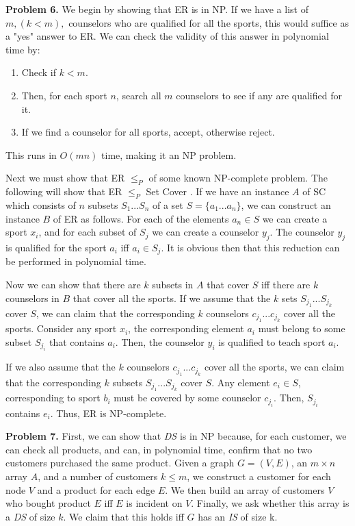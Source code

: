 \documentclass{article}
\begin{document}
\hfill

\textbf{Problem 6.} We begin by showing that ER is in NP. If we have a list of $m, (k < m),$ counselors who are qualified for all the sports, this would suffice as a "yes" answer to ER. We can check the validity of this answer in polynomial time by:

\begin{enumerate}
    \item Check if $k < m$.
    \item Then, for each sport $n$, search all $m$ counselors to see if any are qualified for it.
    \item If we find a counselor for all sports, accept, otherwise reject.
\end{enumerate}

This runs in $O(mn)$ time, making it an NP problem.

\hfill

Next we must show that ER $\leq_P$ of some known NP-complete problem. The following will show that ER $\leq_P$ Set Cover \cite{website:6} \cite{website:7}. If we have an instance $A$ of SC which consists of $n$ subsets $S_1...S_n$ of a set $S = \{ a_1...a_n \}$, we can construct an instance $B$ of ER as follows. For each of the elements $a_n \in S$ we can create a sport $x_i$, and for each subset of $S_j$ we can create a counselor $y_j$. The counselor $y_j$ is qualified for the sport $a_i$ iff $a_i \in S_j$. It is obvious then that this reduction can be performed in polynomial time.

\hfill

Now we can show that there are $k$ subsets in $A$ that cover $S$ iff there are $k$ counselors in $B$ that cover all the sports. If we assume that the $k$ sets $S_{j_1}...S_{j_k}$ cover $S$, we can claim that the corresponding $k$ counselors $c_{j_1}...c_{j_k}$ cover all the sports. Consider any sport $x_i$, the corresponding element $a_i$ must belong to some subset $S_{j_i}$ that contains $a_i$. Then, the counselor $y_i$ is qualified to teach sport $a_i$. 

\hfill

If we also assume that the $k$ counselors $c_{j_1}...c_{j_k}$ cover all the sports, we can claim that the corresponding $k$ subsets $S_{j_1}...S_{j_k}$ cover $S$. Any element $e_i \in S$, corresponding to sport $b_i$ must be covered by some counselor $c_{j_i}$. Then, $S_{j_i}$ contains $e_i$. Thus, ER is NP-complete.

\hfill

\textbf{Problem 7.} First, we can show that \emph{DS} is in NP because, for each customer, we can check all products, and can, in polynomial time, confirm that no two customers purchased the same product. Given a graph $G = (V, E)$, an $m \times n$ array $A$, and a number of customers $k \leq m$, we construct a customer for each node $V$ and a product for each edge $E$. We then build an array of customers $V$ who bought product $E$ iff $E$ is incident on $V$. Finally, we ask whether this array is a \emph{DS} of size $k$. We claim that this holds iff $G$ has an \emph{IS} of size k.
\end{document}
